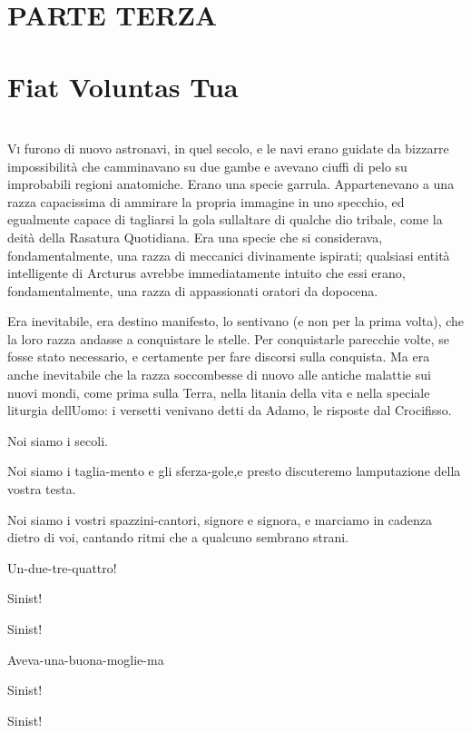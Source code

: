 	{ \chapter*{PARTE TERZA\\\leavevmode\\\footnotesize{Fiat Voluntas Tua}}}
		\chapter{\phantom{text}}
	
	\lettrine{V}{i} furono di nuovo astronavi, in quel secolo, e le navi erano guidate da
	bizzarre impossibilità che camminavano su due gambe e avevano ciuffi di
	pelo su improbabili regioni anatomiche. Erano una specie garrula.
	Appartenevano a una razza capacissima di ammirare la propria immagine in
	uno specchio, ed egualmente capace di tagliarsi la gola
	sull\textquotesingle altare di qualche dio tribale, come la deità della
	Rasatura Quotidiana. Era una specie che si considerava,
	fondamentalmente, una razza di meccanici divinamente ispirati; qualsiasi
	entità intelligente di Arcturus avrebbe immediatamente intuito che essi
	erano, fondamentalmente, una razza di appassionati oratori da dopocena.
	
	Era inevitabile, era destino manifesto, lo sentivano (e non per la prima
	volta), che la loro razza andasse a conquistare le stelle. Per
	conquistarle parecchie volte, se fosse stato necessario, e certamente
	per fare discorsi sulla conquista. Ma era anche inevitabile che la razza
	soccombesse di nuovo alle antiche malattie sui nuovi mondi, come prima
	sulla Terra, nella litania della vita e nella speciale liturgia
	dell\textquotesingle Uomo: i versetti venivano detti da Adamo, le
	risposte dal Crocifisso.
	
	Noi siamo i secoli.
	
	Noi siamo i taglia-mento e gli sferza-gole,e presto discuteremo
	l\textquotesingle amputazione della vostra testa.
	
	Noi siamo i vostri spazzini-cantori, signore e signora, e marciamo in
	cadenza dietro di voi, cantando ritmi che a qualcuno sembrano strani.
	
	Un-due-tre-quattro!
	
	Sinist!
	
	Sinist!
	
	Aveva-una-buona-moglie-ma
	
	Sinist!
	
	Sinist!
	
